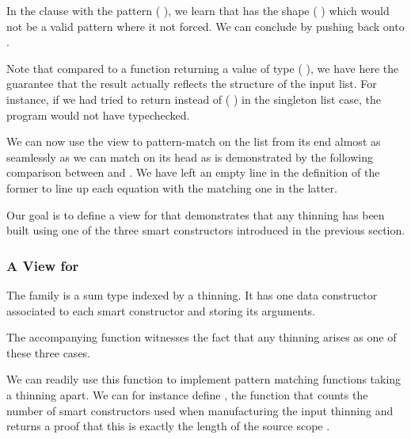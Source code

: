 %
In the clause with the pattern ( \IdrisData{:<} ), we learn
that  has the shape ( \IdrisFunction{++} )
which would not be a valid pattern where it not forced.
%
We can conclude by pushing  back onto .

Note that compared to a function returning a value of type
{ ( \IdrisType{,} )},
we have here the guarantee that the result actually reflects the structure of the
input list.
%
For instance, if we had tried to return  instead of
(\IdrisData{[]} \IdrisData{:<} ) in the singleton list case,
the program would not have typechecked.

We can now use the view to pattern-match on the list from its end almost as
seamlessly as we can match on its head as is demonstrated by the following
comparison between  and .
%
We have left an empty line in the definition of the former to line up each
equation with the matching one in the latter.

\begin{minipage}[t]{0.5\textwidth}
\end{minipage}
\begin{minipage}[t]{0.5\textwidth}
\end{minipage}

Our goal is to define a view for  that demonstrates
that any thinning has been built using one of the three smart
constructors introduced in the previous section.

\subsubsection{A View for }

The  family is a sum type indexed by a thinning. It has one
data constructor associated to each smart constructor and storing its arguments.


The accompanying  function witnesses the fact that any
thinning arises as one of these three cases.


We can readily use this function to implement pattern matching functions taking
a thinning apart. We can for instance define , the function
that counts the number of  smart constructors used when
manufacturing the input thinning and returns a proof that this is exactly the
length of the source scope .

